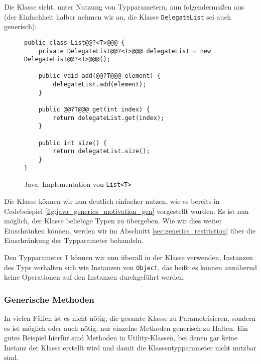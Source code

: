 		Die Klasse sieht, unter Nutzung von Typparametern, nun folgendermaßen aus (der Einfachheit halber nehmen wir an, die Klasse \texttt{DelegateList} sei auch generisch):
		\begin{figure}[H]
			\centering
			\begin{lstlisting}[style = base]
public class List@@?<T>@@@ {
	private DelegateList@@?<T>@@@ delegateList = new DelegateList@@?<T>@@@();
	
	public void add(@@?T@@@ element) {
		delegateList.add(element);
	}
	
	public @@?T@@@ get(int index) {
		return delegateList.get(index);
	}
	
	public int size() {
		return delegateList.size();
	}
}
			\end{lstlisting}
			\caption{Java: Implementation von \texttt{List<T>}}
		\end{figure}
		
		Die Klasse können wir nun deutlich einfacher nutzen, wie es bereits in Codebeispiel \ref{fig:java_generics_motivation_gen} vorgestellt wurden. Es ist nun möglich, der Klasse beliebige Typen zu übergeben. Wie wir dies weiter Einschränken können, werden wir im Abschnitt \ref{sec:generics_restriction} über die Einschränkung der Typparameter behandeln.
		
		Den Typparameter \texttt{T} können wir nun überall in der Klasse verwenden, Instanzen des Typs verhalten sich wie Instanzen von \texttt{Object}, das heißt es können annähernd keine Operationen auf den Instanzen durchgeführt werden.
		
		
	
	\subsubsection{Generische Methoden}
		In vielen Fällen ist es nicht nötig, die gesamte Klasse zu Parametrisieren, sondern es ist möglich oder auch nötig, nur einzelne Methoden generisch zu Halten. Ein gutes Beispiel hierfür sind Methoden in Utility-Klassen, bei denen gar keine Instanz der Klasse erstellt wird und damit die Klassentypparameter nicht nutzbar sind.
		
